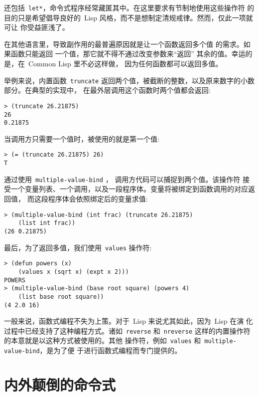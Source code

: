 还包括~\verb|let*|，命令式程序经常藏匿其中。在这里要求有节制地使用这些操作符
%
的目的只是希望倡导良好的~Lisp 风格，而不是想制定清规戒律。然而，仅此一项就可让
你受益匪浅了。

在其他语言里，导致副作用的最普遍原因就是让一个函数返回多个值
的需求。如果函数只能返回
一个值，那它就不得不通过改变参数来``返回'' 其余的值。幸运的是，在~Common
Lisp 里不必这样做，
因为任何函数都可以返回多值。

举例来说，内置函数~\verb|truncate| 
返回两个值，被截断的整数，以及原来数字的小数部分。在典型的实现中，
在最外层调用这个函数时两个值都会返回:
\begin{lstlisting}
> (truncate 26.21875)
26
0.21875
\end{lstlisting}
当调用方只需要一个值时，被使用的就是第一个值:
\begin{lstlisting}
> (= (truncate 26.21875) 26)
T
\end{lstlisting}
通过使用~\texttt{multiple-value-bind}%
，
调用方代码可以捕捉到两个值。该操作符
接受一个变量列表、一个调用，以及一段程序体。变量将被绑定到函数调用的对应返回值，
而这段程序体会依照绑定后的变量求值:
\begin{lstlisting}
> (multiple-value-bind (int frac) (truncate 26.21875)
    (list int frac))
(26 0.21875)
\end{lstlisting}
最后，为了返回多值，我们使用~\texttt{values} 操作符:
\begin{lstlisting}
> (defun powers (x)
    (values x (sqrt x) (expt x 2)))
POWERS
> (multiple-value-bind (base root square) (powers 4)
    (list base root square))
(4 2.0 16)
\end{lstlisting}

一般来说，函数式编程不失为上策。对于~Lisp 来说尤其如此，因为~Lisp 在演
化过程中已经支持了这种编程方式。诸如~\texttt{reverse} 
和~\texttt{nreverse} 这样的内置操作符的本意就是以这种方式被使用的。其他
操作符，例如~\texttt{values} 和~\texttt{multiple-value-bind}，是为了便
于进行函数式编程而专门提供的。

\section{内外颠倒的命令式}
\label{sec:imperative_outside-in}

